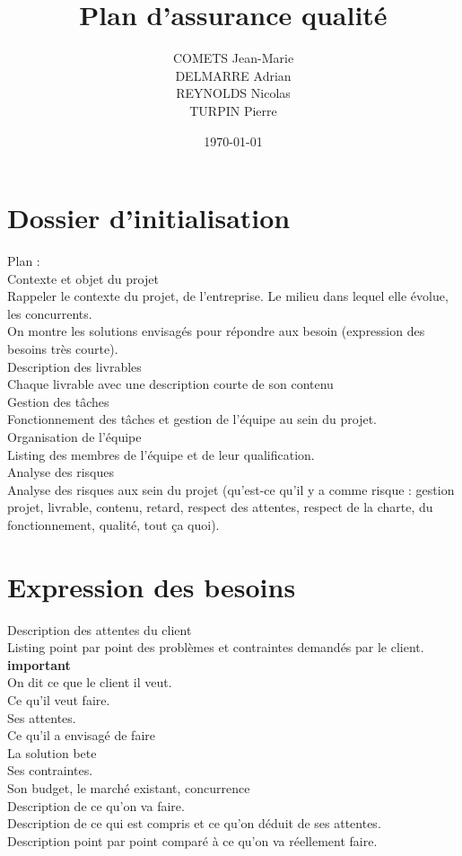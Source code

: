 \documentclass[11pt, a4paper]{article}
\begin{document}
\title{Plan d'assurance qualité}
\author{
  COMETS Jean-Marie \\
  DELMARRE Adrian \\
  REYNOLDS Nicolas \\
  TURPIN Pierre
}
\date{\today}

\maketitle \newpage


\section{Dossier d'initialisation}
Plan :
  \\ Contexte et objet du projet
    \\ Rappeler le contexte du projet, de l'entreprise. Le milieu dans lequel elle
    évolue, les concurrents.
    \\ On montre les solutions envisagés pour répondre aux besoin (expression des
    besoins très courte).
  \\ Description des livrables
    \\ Chaque livrable avec une description courte de son contenu
  \\ Gestion des tâches
    \\ Fonctionnement des tâches et gestion de l'équipe au sein du projet.
  \\ Organisation de l'équipe
    \\ Listing des membres de l'équipe et de leur qualification.
  \\ Analyse des risques
    \\ Analyse des risques aux sein du projet (qu'est-ce qu'il y a comme risque :
    gestion projet, livrable, contenu, retard, respect des attentes, respect de
    la charte, du fonctionnement, qualité, tout ça quoi).

\section{Expression des besoins}
Description des attentes du client
\\ Listing point par point des problèmes et contraintes demandés par le client.
\textbf{important}
\\ On dit ce que le client il veut.
\\ Ce qu'il veut faire.
\\ Ses attentes.
  \\ Ce qu'il a envisagé de faire
  \\ La solution bete
\\ Ses contraintes.
  \\ Son budget, le marché existant, concurrence
\\ Description de ce qu'on va faire.
  \\ Description de ce qui est compris et ce qu'on déduit de ses attentes.
  \\ Description point par point comparé à ce qu'on va réellement faire.
\end{document}

